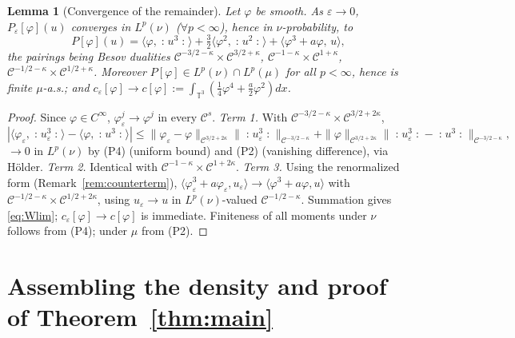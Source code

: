 \documentclass[12pt]{article}
\newcommand{\bT}{\mathbb{T}}
\newcommand{\eps}{\varepsilon}
\newcommand{\Wick}[1]{\mathopen{:}#1\mathclose{:}}
\theoremstyle{plain}
\newtheorem{lemma}{Lemma}
\theoremstyle{definition}
\begin{document}
\begin{lemma}[Convergence of the remainder]\label{lem:W-converge}
Let $\varphi$ be smooth. As $\eps\to0$, $P_\eps[\varphi](u)$ converges in $L^p(\nu)$
($\forall p<\infty$), hence in $\nu$-probability, to
\begin{equation}\label{eq:Wlim}
P[\varphi](u)=\langle \varphi,\Wick{u^3}\rangle
+\tfrac32\langle \varphi^2,\Wick{u^2}\rangle
+\langle \varphi^3+a\varphi,\,u\rangle ,
\end{equation}
the pairings being Besov dualities $\mathcal C^{-3/2-\kappa}\times\mathcal C^{3/2+\kappa}$,
$\mathcal C^{-1-\kappa}\times\mathcal C^{1+\kappa}$,
$\mathcal C^{-1/2-\kappa}\times\mathcal C^{1/2+\kappa}$. Moreover
$P[\varphi]\in L^p(\nu)\cap L^p(\mu)$ for all $p<\infty$, hence is finite
$\mu$-a.s.; and $c_\eps[\varphi]\to c[\varphi]:=\int_{\bT^3}(\tfrac14\varphi^4+\tfrac a2\varphi^2)dx$.
\end{lemma}

\begin{proof}
Since $\varphi\in C^\infty$, $\varphi_\eps^j\to\varphi^j$ in every $\mathcal C^s$.
\emph{Term 1.} With $\mathcal C^{-3/2-\kappa}\times\mathcal C^{3/2+2\kappa}$,
\[
|\langle\varphi_\eps,\Wick{u_\eps^3}\rangle-\langle\varphi,\Wick{u^3}\rangle|
\le\|\varphi_\eps-\varphi\|_{\mathcal C^{3/2+2\kappa}}\|\Wick{u_\eps^3}\|_{\mathcal C^{-3/2-\kappa}}
+\|\varphi\|_{\mathcal C^{3/2+2\kappa}}\|\Wick{u_\eps^3}-\Wick{u^3}\|_{\mathcal C^{-3/2-\kappa}},
\]
$\to0$ in $L^p(\nu)$ by (P4) (uniform bound) and (P2) (vanishing difference), via
H\"older. \emph{Term 2.} Identical with $\mathcal C^{-1-\kappa}\times\mathcal C^{1+2\kappa}$.
\emph{Term 3.} Using the renormalized form (Remark~\ref{rem:counterterm}),
$\langle\varphi_\eps^3+a\varphi_\eps,u_\eps\rangle\to\langle\varphi^3+a\varphi,u\rangle$
with $\mathcal C^{-1/2-\kappa}\times\mathcal C^{1/2+2\kappa}$, using $u_\eps\to u$
in $L^p(\nu)$-valued $\mathcal C^{-1/2-\kappa}$. Summation gives \eqref{eq:Wlim};
$c_\eps[\varphi]\to c[\varphi]$ is immediate. Finiteness of all moments under $\nu$
follows from (P4); under $\mu$ from (P2).
\end{proof}

\section{Assembling the density and proof of Theorem~\ref{thm:main}}\label{sec:assemble}
\end{document}
